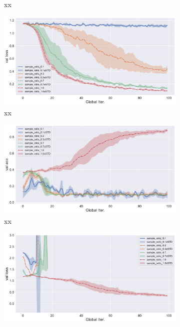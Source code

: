 \begin{figure}[ht]
\begin{subfigure}{.5\textwidth}
  \caption{xx}
  \label{fig:proxskip-compare-sample-ratio-val-acc}
\end{subfigure}%
\begin{subfigure}{.5\textwidth}
  \centering
  \includegraphics[width=.95\linewidth]{figures/proxskip-compare-sample-ratio-val-loss.pdf}
  \caption{xx}
  \label{fig:proxskip-compare-sample-ratio-val-loss}
\end{subfigure}
\begin{subfigure}{.5\textwidth}
  \centering
  \includegraphics[width=.95\linewidth]{figures/fedsplit-compare-sample-ratio-val-acc.pdf}
  \caption{xx}
  \label{fig:fedsplit-compare-sample-ratio-val-acc}
\end{subfigure}%
\begin{subfigure}{.5\textwidth}
  \centering
  \includegraphics[width=.95\linewidth]{figures/fedsplit-compare-sample-ratio-val-loss.pdf}

\end{subfigure}
\end{figure}
